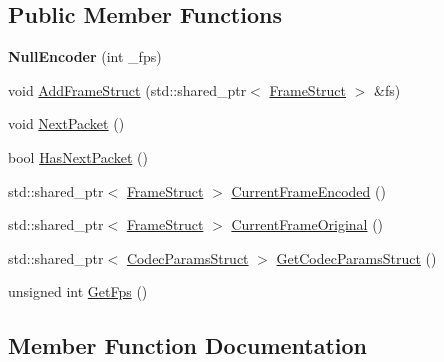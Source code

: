 \subsection*{Public Member Functions}
\begin{DoxyCompactItemize}
\item 
\mbox{\label{classmoetsi_1_1ssp_1_1NullEncoder_aaae4b8ed8b56ae9526f04853b56d1650}} 
{\bfseries Null\+Encoder} (int \+\_\+fps)
\item 
void \hyperlink{classmoetsi_1_1ssp_1_1NullEncoder_afb703c45a8d4c58f650decabb18f357b}{Add\+Frame\+Struct} (std\+::shared\+\_\+ptr$<$ \hyperlink{structmoetsi_1_1ssp_1_1FrameStruct}{Frame\+Struct} $>$ \&fs)
\item 
void \hyperlink{classmoetsi_1_1ssp_1_1NullEncoder_a5fe7215f2b462690208b2a144e962e14}{Next\+Packet} ()
\item 
bool \hyperlink{classmoetsi_1_1ssp_1_1NullEncoder_a359eb668c16a1ef7963214f7f6303af4}{Has\+Next\+Packet} ()
\item 
std\+::shared\+\_\+ptr$<$ \hyperlink{structmoetsi_1_1ssp_1_1FrameStruct}{Frame\+Struct} $>$ \hyperlink{classmoetsi_1_1ssp_1_1NullEncoder_ae48926f99c368849ee8822aed10ac1b5}{Current\+Frame\+Encoded} ()
\item 
std\+::shared\+\_\+ptr$<$ \hyperlink{structmoetsi_1_1ssp_1_1FrameStruct}{Frame\+Struct} $>$ \hyperlink{classmoetsi_1_1ssp_1_1NullEncoder_ad972dfdb93d2f609cdc885c53079ede2}{Current\+Frame\+Original} ()
\item 
std\+::shared\+\_\+ptr$<$ \hyperlink{structmoetsi_1_1ssp_1_1CodecParamsStruct}{Codec\+Params\+Struct} $>$ \hyperlink{classmoetsi_1_1ssp_1_1NullEncoder_a29839bd02ad42ecd9cf8e6cce707a9fe}{Get\+Codec\+Params\+Struct} ()
\item 
unsigned int \hyperlink{classmoetsi_1_1ssp_1_1NullEncoder_ad6727fa08528622081aa4eca4aacc6c1}{Get\+Fps} ()
\end{DoxyCompactItemize}


\subsection{Member Function Documentation}
\mbox{\label{classmoetsi_1_1ssp_1_1NullEncoder_afb703c45a8d4c58f650decabb18f357b}} 
